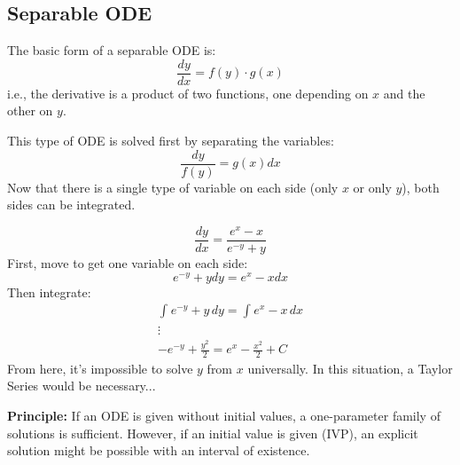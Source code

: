 \documentclass[12pt]{article}
\begin{document}
\subsection{Separable ODE}
\label{ssec:separableODE}

The basic form of a separable ODE is:
\begin{equation*}
  \frac{dy}{dx} = f(y) \cdot g(x)
\end{equation*}
i.e., the derivative is a product of two functions, one depending on $x$ and the other on $y$.

This type of ODE is solved first by separating the variables:
\begin{equation*}
  \frac{dy}{f(y)} = g(x) dx
\end{equation*}
Now that there is a single type of variable on each side (only $x$ or only $y$), both sides can be integrated.

\begin{example}
  \begin{equation*}
    \frac{dy}{dx} = \frac{e^x - x}{e^{-y} + y}
  \end{equation*}
  First, move to get one variable on each side:
  \begin{equation*}
    e^{-y} + y dy = e^x - x dx
  \end{equation*}
  Then integrate:
  \begin{gather*}
    \int_{}^{} e^{-y} + y \, dy = \int_{}^{} e^x - x \, dx \\
    \vdots \\
    -e^{-y} + \frac{y^2}{2} = e^x - \frac{x^2}{2} + C
  \end{gather*}
  From here, it's impossible to solve $y$ from $x$ universally. In this situation, a Taylor Series would be necessary...
\end{example}

\textbf{Principle:} If an ODE is given without initial values, a one-parameter family of solutions is sufficient. However, if an initial value is given (IVP), an explicit solution might be possible with an interval of existence.
\end{document}
